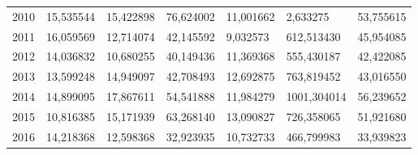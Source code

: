\begin{table}
\begin{tabular}{p{1cm}p{2cm}p{2cm}p{2cm}p{2cm}p{2cm}p{2cm}}
 2010 &                              15,535544 &                                    15,422898 &            76,624002 &                      11,001662 &    2,633275 &  53,755615 \\
 2011 &                              16,059569 &                                    12,714074 &            42,145592 &                       9,032573 &  612,513430 &  45,954085 \\
 2012 &                              14,036832 &                                    10,680255 &            40,149436 &                      11,369368 &  555,430187 &  42,422085 \\
 2013 &                              13,599248 &                                    14,949097 &            42,708493 &                      12,692875 &  763,819452 &  43,016550 \\
 2014 &                              14,899095 &                                    17,867611 &            54,541888 &                      11,984279 & 1001,304014 &  56,239652 \\
 2015 &                              10,816385 &                                    15,171939 &            63,268140 &                      13,090827 &  726,358065 &  51,921680 \\
 2016 &                              14,218368 &                                    12,598368 &            32,923935 &                      10,732733 &  466,799983 &  33,939823 \\
\bottomrule
\end{tabular}
\end{table}
